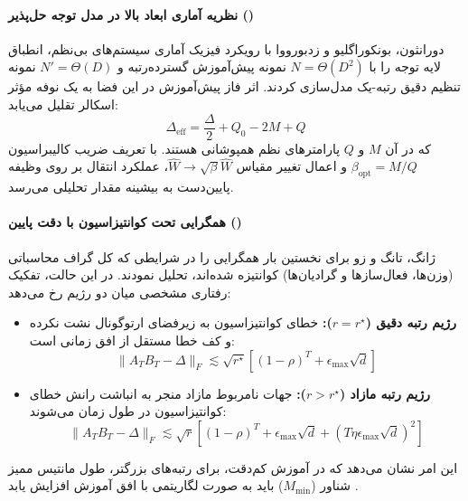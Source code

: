 \paragraph*{نظریه آماری ابعاد بالا در مدل توجه حل‌پذیر ()}
دورانثون، بونکوراگلیو و زدبورووا \cite{duranthon2026high} با رویکرد فیزیک آماری سیستم‌های بی‌نظم، انطباق لایه توجه را با $N = \Theta(D^2)$ نمونه پیش‌آموزش گسترده‌رتبه و $N' = \Theta(D)$ نمونه تنظیم دقیق رتبه-یک مدل‌سازی کردند. اثر فاز پیش‌آموزش در این فضا به یک نوفه مؤثر اسکالر تقلیل می‌یابد:
\begin{equation}
    \Delta_{\text{eff}} = \frac{\Delta}{2} + Q_0 - 2M + Q
\end{equation}
که در آن $M$ و $Q$ پارامترهای نظم همپوشانی هستند. با تعریف ضریب کالیبراسیون $\beta_{\text{opt}} = M/Q$ و اعمال تغییر مقیاس $\hat{W} \to \sqrt{\beta}\hat{W}$، عملکرد انتقال بر روی وظیفه پایین‌دست به بیشینه مقدار تحلیلی می‌رسد.

\paragraph*{همگرایی  تحت کوانتیزاسیون با دقت پایین ()}
ژانگ، تانگ و زو \cite{zhang2026convergence} برای نخستین بار همگرایی  را در شرایطی که کل گراف محاسباتی (وزن‌ها، فعال‌سازها و گرادیان‌ها) کوانتیزه شده‌اند، تحلیل نمودند. در این حالت، تفکیک رفتاری مشخصی میان دو رژیم رخ می‌دهد:
\begin{itemize}
    \item \textbf{رژیم رتبه دقیق ($r = r^\star$):} خطای کوانتیزاسیون به زیرفضای ارتوگونال نشت نکرده و کف خطا مستقل از افق زمانی است:
    \begin{equation}
        \|A_T B_T - \Delta\|_F \lesssim \sqrt{r^\star} \left[ (1 - \rho)^T + \epsilon_{\max} \sqrt{d} \right]
    \end{equation}
    \item \textbf{رژیم رتبه مازاد ($r > r^\star$):} جهات نامربوط مازاد منجر به انباشت رانش خطای کوانتیزاسیون در طول زمان می‌شوند:
    \begin{equation}
        \|A_T B_T - \Delta\|_F \lesssim \sqrt{r} \left[ (1 - \rho)^T + \epsilon_{\max} \sqrt{d} + \left( T \eta \epsilon_{\max} \sqrt{d} \right)^2 \right]
    \end{equation}
\end{itemize}
این امر نشان می‌دهد که در آموزش کم‌دقت، برای رتبه‌های بزرگتر، طول مانتیس ممیز شناور ($M_{\min}$) باید به صورت لگاریتمی با افق آموزش افزایش یابد \cite{zhang2026convergence}.

